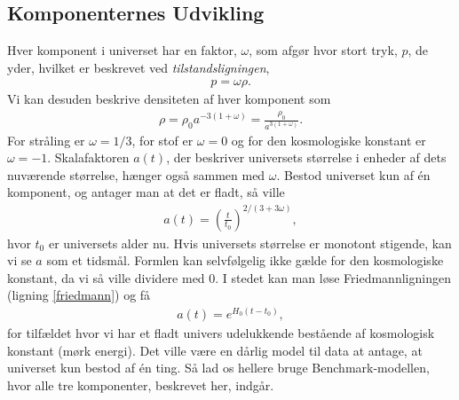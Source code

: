\subsection{Komponenternes Udvikling}
Hver komponent i universet har en faktor, $\omega$, som afgør hvor stort tryk, $p$, de yder, hvilket er beskrevet ved \emph{tilstandsligningen},
\begin{align}
p=\omega \rho.
\end{align}
Vi kan desuden beskrive densiteten af hver komponent som
\begin{align} \label{density}
\rho = \rho_0 a^{-3(1+\omega)} = \frac{\rho_0}{a^{3(1+\omega)}}.
\end{align}
For stråling er $\omega = 1/3$, for stof er $\omega=0$ og for den kosmologiske konstant er $\omega=-1$.
Skalafaktoren $a(t)$, der beskriver universets størrelse i enheder af dets nuværende størrelse, hænger også sammen med $\omega$. Bestod universet kun af én komponent, og antager man at det er fladt, så ville
\begin{align}
a(t)=\left(\frac{t}{t_0}\right)^{2/(3+3\omega)},
\end{align}
hvor $t_0$ er universets alder nu. Hvis universets størrelse er monotont stigende, kan vi se $a$ som et tidsmål. Formlen kan selvfølgelig ikke gælde for den kosmologiske konstant, da vi så ville dividere med 0. I stedet kan man løse Friedmannligningen (ligning \eqref{friedmann}) og få
\begin{align}
	a(t)=e^{H_0(t-t_0)},
\end{align}
for tilfældet hvor vi har et fladt univers udelukkende bestående af kosmologisk konstant (mørk energi).
Det ville være en dårlig model til data at antage, at universet kun bestod af én ting. Så lad os hellere bruge Benchmark-modellen, hvor alle tre komponenter, beskrevet her, indgår. \\

